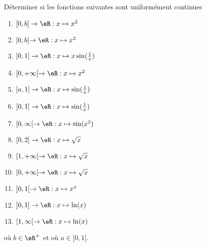 
\begin{exercice}\label{exo0094}

Déterminer si les fonctions suivantes sont uniformément continues
\begin{multicols}{2}
\begin{enumerate}
\item $[0,b] \rightarrow \eR: x \mapsto x^2$
\item $]0,b[\rightarrow \eR: x \mapsto x^2$
\item $]0,1] \rightarrow \eR: x \mapsto x\sin(\frac1{x})$
\item $[0,+\infty[ \rightarrow \eR: x \mapsto x^2$
\item $[a,1] \rightarrow \eR: x \mapsto  \sin(\frac1{x})$
\item $]0,1] \rightarrow \eR: x \mapsto  \sin(\frac1{x})$
\item $[0,\infty[ \rightarrow \eR: x \mapsto \sin(x^2)$
\item $[0,2] \rightarrow \eR: x \mapsto \sqrt{x}$
\item $[1,+\infty[ \rightarrow \eR: x \mapsto \sqrt{x}$
\item $[0, +\infty[ \rightarrow \eR: x \mapsto \sqrt{x}$
\item $]0,1[ \rightarrow \eR: x \mapsto x^x$
\item $]0,1] \rightarrow \eR: x \mapsto \ln(x)$
\item $[1,\infty[ \rightarrow \eR: x \mapsto \ln(x)$
\end{enumerate}
\end{multicols}
où $b \in \eR^+$ et où $a \in ]0,1[$.

\end{exercice}
